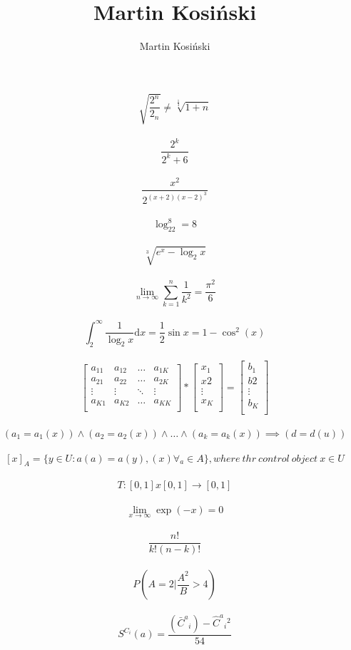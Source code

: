 \documentclass[a4paper]{article}
\title{Martin Kosiński}
\author{Martin Kosiński}
\begin{document}
$$ \sqrt{ \frac{2^{n}}{2_n}} \neq \sqrt[\frac{1}{3}]{1+n} $$\\

$$\frac{2^k}{2^k+6}$$\\

$$\frac{x^2}{2^{(x+2)(x-2)^3}}$$\\

$$\log_22^8=8$$\\


$$\sqrt[3]{e^x-\log_2x}$$\\


$$\lim_{n\to\infty}\sum_{k=1}^{n}\frac{1}{k^2}=\frac{\pi^2}{6}$$\\



$$\int_{2}^{\infty}\frac{1}{\log_2x}\mathrm{d}x=\frac{1}{2}\sin x=1-\cos^2(x)$$\\



$$
\left[ \begin{array}{cccc}
a_{11} & a_{12} & \ldots & a_{1K} \\
a_{21} & a_{22} & \ldots & a_{2K} \\
\vdots & \vdots & \ddots & \vdots \\
a_{K1} & a_{K2} & \ldots & a_{KK}\\
\end{array} \right] *\left[\begin{array}{c}
x_{1}\\
x{2}\\
\vdots\\
x_{K}\\
\end{array}\right]=\left[\begin{array}{c}
b_{1}\\
b{2}\\
\vdots\\
b_{K}\\
\end{array}\right]$$\\



$$(a_1=a_1(x))\wedge(a_2=a_2(x))\wedge\ldots\wedge(a_k=a_k(x))\implies(d=d(u))$$\\


$$[x]_A=\{y\in U:a(a)=a(y),(x)\forall_a \in A\},where \ thr \ control \ object \ x\in U$$\\

$$T:[0,1]x[0,1]\to[0,1]$$\\

$$\lim_{x\to\infty}\exp{(-x)}=0$$\\

$$\frac{n!}{k!(n-k)!}$$\\

$$P\left( A=2 \bigg| \frac{A^2}{B}>4\right) $$\\

$$S^{C_i}(a)=\frac{(\bar{C}^a{_i})-\hat{C}^a{_i}^2}{54}$$
\end{document}
